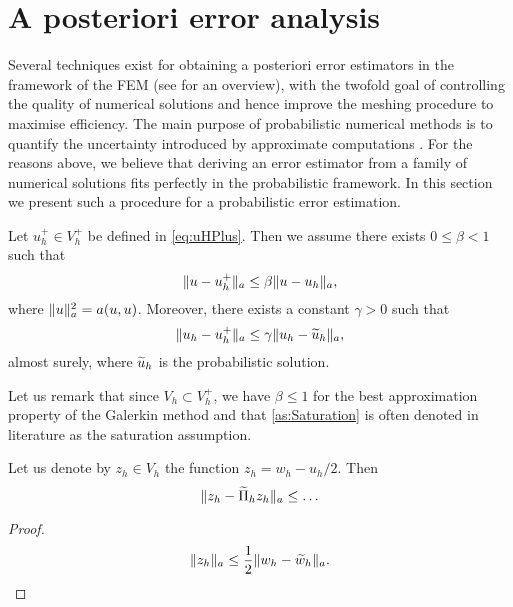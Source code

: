 \documentclass[10pt]{article}
\begin{document}
\section{A posteriori error analysis}\label{sec:errorestimation}
 
Several techniques exist for obtaining a posteriori error estimators in the framework of the FEM (see \cite{Ver13} for an overview), with the twofold goal of controlling the quality of numerical solutions and hence improve the meshing procedure to maximise efficiency. The main purpose of probabilistic numerical methods is to quantify the uncertainty introduced by approximate computations \cite{HOG15}. For the reasons above, we believe that deriving an error estimator from a family of numerical solutions fits perfectly in the probabilistic framework. In this section we present such a procedure for a probabilistic error estimation.
\begin{assumption}\label{as:Saturation} Let $u_h^+ \in V_h^+$ be defined in \eqref{eq:uHPlus}. Then we assume there exists $0 \leq \beta < 1$ such that
	\begin{equation}
		\lVert u - u_h^+\rVert_a \leq \beta \lVert u - u_h\rVert_a,
	\end{equation} 
	where $\lVert u\rVert_a^2 = a(u, u)$. Moreover, there exists a constant $\gamma > 0$ such that
	\begin{equation}\label{eq:Saturation2}
		\lVert u_h - u_h^+\rVert_a \leq \gamma \lVert u_h - \widetilde u_h\rVert_a,
	\end{equation}
	almost surely, where $\widetilde u_h$ is the probabilistic solution.
\end{assumption}


Let us remark that since $V_h \subset V_h^+$, we have $\beta \leq 1$ for the best approximation property of the Galerkin method and that \cref{as:Saturation} is often denoted in literature as the saturation assumption.


\begin{lemma} Let us denote by $z_h \in V_h$ the function $z_h = w_h - u_h /2$. Then
	\begin{equation}
		\lVert z_h - \widetilde \Pi_h z_h\rVert_a \leq \ldots
	\end{equation}
\end{lemma}

\begin{proof} 
	\begin{equation}
		\lVert z_h\rVert_a \leq \frac12 \lVert w_h - \widetilde w_h\rVert_a.
	\end{equation}
\end{proof}
\end{document}
